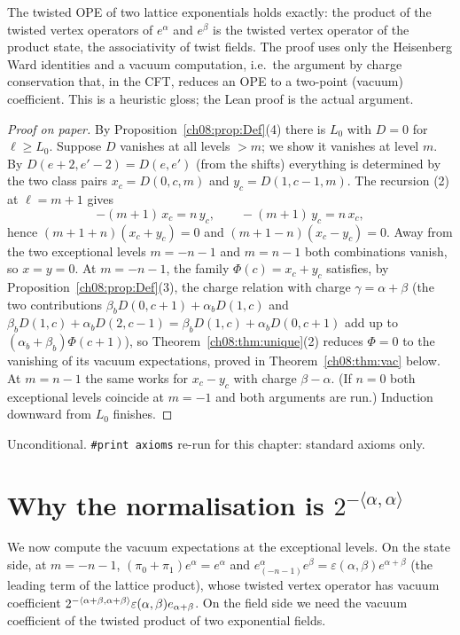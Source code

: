 \begin{physics}
The twisted OPE of two lattice exponentials holds exactly: the product of the twisted vertex operators of $e^\alpha$ and $e^\beta$ is the twisted vertex operator of the product state, the associativity of twist fields. The proof uses only the Heisenberg Ward identities and a vacuum computation, i.e.\ the argument by charge conservation that, in the CFT, reduces an OPE to a two-point (vacuum) coefficient. This is a heuristic gloss; the Lean proof is the actual argument.
\end{physics}
\begin{proof}[Proof on paper]
By Proposition~\ref{ch08:prop:Def}(4) there is $L_0$ with $D=0$ for $\ell\ge L_0$.  Suppose $D$
vanishes at all levels $>m$; we show it vanishes at level $m$.  By $D(e+2,e'-2)=D(e,e')$ (from the
shifts) everything is determined by the two class pairs $x_c=D(0,c,m)$ and $y_c=D(1,c-1,m)$.  The
recursion (2) at $\ell=m+1$ gives
\begin{equation*}
  -(m+1)\,x_c=n\,y_c,\qquad -(m+1)\,y_c=n\,x_c ,
\end{equation*}
hence $(m+1+n)(x_c+y_c)=0$ and $(m+1-n)(x_c-y_c)=0$.  Away from the two exceptional levels
$m=-n-1$ and $m=n-1$ both combinations vanish, so $x=y=0$.  At $m=-n-1$, the family
$\Phi(c)=x_c+y_c$ satisfies, by Proposition~\ref{ch08:prop:Def}(3), the charge relation with charge
$\gamma=\alpha+\beta$ (the two contributions $\beta_bD(0,c+1)+\alpha_bD(1,c)$ and
$\beta_bD(1,c)+\alpha_bD(2,c-1)=\beta_bD(1,c)+\alpha_bD(0,c+1)$ add up to
$(\alpha_b+\beta_b)\Phi(c+1)$), so Theorem~\ref{ch08:thm:unique}(2) reduces $\Phi=0$ to the
vanishing of its vacuum expectations, proved in Theorem~\ref{ch08:thm:vac} below.  At $m=n-1$
the same works for $x_c-y_c$ with charge $\beta-\alpha$.  (If $n=0$ both exceptional levels
coincide at $m=-1$ and both arguments are run.)  Induction downward from $L_0$ finishes.
\end{proof}
\begin{status}
Unconditional.  \texttt{\#print axioms}  re-run for this chapter: standard axioms only.
\end{status}

\section{Why the normalisation is \texorpdfstring{$2^{-\langle\alpha,\alpha\rangle}$}{2 to the minus alpha squared}}\label{ch08:sec:normalisation}

We now compute the vacuum expectations at the exceptional levels.  On the state side, at
$m=-n-1$, $(\pi_0+\pi_1)e^\alpha=e^\alpha$ and
$e^\alpha_{(-n-1)}e^\beta=\varepsilon(\alpha,\beta)e^{\alpha+\beta}$ (the leading term of the lattice
product), whose twisted vertex operator has vacuum coefficient
$2^{-\langle \alpha+\beta,\alpha+\beta\rangle}\varepsilon(\alpha,\beta)e_{\alpha+\beta}$.  On the field side
we need the vacuum coefficient of the twisted product of two exponential fields.

